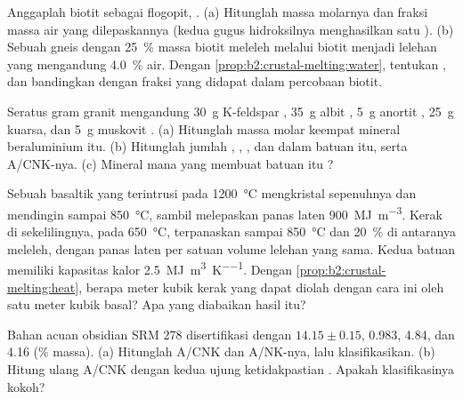 \begin{exercise}[$\star\star$]\label{exo:b2:crustal-melting:5}
Anggaplah biotit sebagai flogopit, . (a) Hitunglah massa molarnya dan
fraksi massa air yang dilepaskannya (kedua gugus hidroksilnya menghasilkan satu ).
(b) Sebuah gneis dengan \qty{25}{\percent} massa biotit meleleh melalui  biotit
menjadi lelehan yang mengandung \qty{4.0}{\percent} air. Dengan
\cref{prop:b2:crustal-melting:water}, tentukan , dan bandingkan dengan
fraksi yang didapat dalam percobaan  biotit.
\end{exercise}

\begin{exercise}[$\star\star$]\label{exo:b2:crustal-melting:6}
Seratus gram granit mengandung \qty{30}{\gram} K-feldspar ,
\qty{35}{\gram} albit , \qty{5}{\gram} anortit ,
\qty{25}{\gram} kuarsa, dan \qty{5}{\gram} muskovit .
(a) Hitunglah massa molar keempat mineral beraluminium itu. (b) Hitunglah jumlah
, , , dan  dalam batuan itu, serta A/CNK-nya. (c) Mineral
mana yang membuat batuan itu ?
\end{exercise}

\begin{exercise}[$\star\star$]\label{exo:b2:crustal-melting:7}
Sebuah  basaltik yang terintrusi pada \qty{1200}{\celsius} mengkristal sepenuhnya dan mendingin sampai
\qty{850}{\celsius}, sambil melepaskan panas laten \qty{900}{\mega\joule\per\cubic\metre}.
Kerak di sekelilingnya, pada \qty{650}{\celsius}, terpanaskan sampai \qty{850}{\celsius} dan
\qty{20}{\percent} di antaranya meleleh, dengan panas laten per satuan volume lelehan yang sama. Kedua
batuan memiliki kapasitas kalor \qty{2.5}{\mega\joule\per\cubic\metre\per\kelvin}. Dengan
\cref{prop:b2:crustal-melting:heat}, berapa meter kubik kerak yang dapat diolah dengan cara ini oleh satu meter kubik
basal? Apa yang diabaikan hasil itu?
\end{exercise}

\begin{exercise}[$\star\star$]\label{exo:b2:crustal-melting:8}
Bahan acuan obsidian SRM 278 disertifikasi dengan 
$14.15 \pm 0.15$,  0.983,  4.84, dan  4.16 (\unit{\percent}
massa). (a) Hitunglah A/CNK dan A/NK-nya, lalu klasifikasikan. (b) Hitung ulang A/CNK dengan kedua
ujung ketidakpastian . Apakah klasifikasinya kokoh?
\end{exercise}

